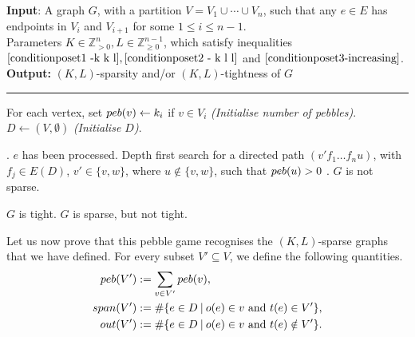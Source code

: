 \documentclass{article}
\begin{document}
\begin{algorithm}[h]
\textbf{Input}: A graph $G$, with a partition $V=V_1\cup \cdots \cup V_n$, such that any $e\in E$ has endpoints in $V_i$ and $V_{i+1}$ for some $1 \leq i \leq n-1$.\\
Parameters $K\in \mathbb{Z}^{n}_{>0} ,L\in \mathbb{Z}^{n-1}_{\geq 0}$, which satisfy inequalities $\eqref{conditionposet1 -k k l},\eqref{conditionposet2 - k l l}$ and $\eqref{conditionposet3-increasing}$.\\
\textbf{Output:} $(K,L)$-sparsity and/or $(K,L)$-tightness of $G$
\hrule

\begin{algorithmic} 
\State  For each vertex, set $\peb(v) \gets k_{i}$ if $v\in V_{i}$ \textit{(Initialise number of pebbles)}.
\State $D\gets(V, \emptyset)$  \textit{(Initialise $D$)}.

                \State {}.
                \State $e$ has been processed.
            \Else
                \State Depth first search for a directed path $(v'f_1\dots f_n u)$, with $f_j\in E(D)$, $v'\in\{v,w\}$, where $u\notin \{v,w\}$, such that $\peb(u)>0$
                    \State {}. 
                \Else     
                    \State \Return $G$ is not sparse. 
                \EndIf
            \EndIf 
        \EndWhile
    \EndFor
\EndFor

\State \Return $G$ is tight. 
\Else 
\State \Return $G$ is sparse, but not tight. 
\EndIf
\end{algorithmic}
\caption{Pebble game for $(K,L)$-sparse graphs}
\label{algo:posets}
\end{algorithm}

\newpage
Let us now prove that this pebble game recognises the $(K,L)$-sparse graphs that we have defined. For every subset $V' \subseteq V$, we define the following quantities.
\begin{align*}
    \peb(V')&:= \sum_{v\in V'} \peb(v),\\
    \spa(V')&:=\# \{e\in D \: \vert \: o(e) \in v \text{ and } t(e) \in V' \}, \\
    \out(V')&:=\# \{e\in D \: \vert \: o(e) \in v \text{ and } t(e) \notin V' \}.
\end{align*}
\end{document}

